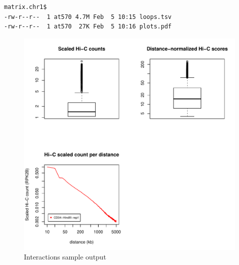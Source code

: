 \begin{lstlisting}
matrix.chr1$
-rw-r--r--  1 at570 4.7M Feb  5 10:15 loops.tsv
-rw-r--r--  1 at570  27K Feb  5 10:16 plots.pdf
\end{lstlisting}
\begin{figure}[!htb]
    \centering
    \includegraphics[width=\textwidth,height=\textheight,keepaspectratio]{figure/interactions_plots}
    \caption{Interactions sample output} %
    \label{fig:interactions_plots}
\end{figure}
\clearpage
